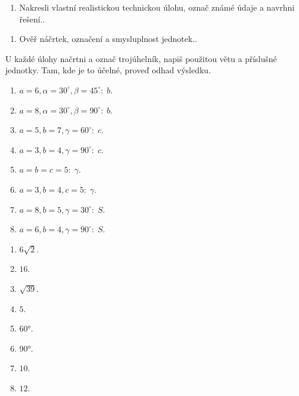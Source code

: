 \documentclass[11pt,a4paper]{article}
\begin{document}
\begin{zadaniReseniBox}[title={Rozšíření 1}]
\begin{enumerate}[label=\alph*)]
\item Nakresli vlastní realistickou technickou úlohu, označ známé údaje a navrhni řešení..
\end{enumerate}
\tcblower
\begin{enumerate}[label=\alph*)]
\item Ověř náčrtek, označení a smysluplnost jednotek..
\end{enumerate}
\end{zadaniReseniBox}
U každé úlohy načrtni a označ trojúhelník, napiš použitou větu a příslušné jednotky. Tam, kde je to účelné, proveď odhad výsledku.
\begin{zadaniReseniBox}[title={Domácí úkol}]
\begin{enumerate}[label=\alph*)]
\item $a=6,\alpha=30^\circ,\beta=45^\circ:\;b$.
\item $a=8,\alpha=30^\circ,\beta=90^\circ:\;b$.
\item $a=5,b=7,\gamma=60^\circ:\;c$.
\item $a=3,b=4,\gamma=90^\circ:\;c$.
\item $a=b=c=5:\;\gamma$.
\item $a=3,b=4,c=5:\;\gamma$.
\item $a=8,b=5,\gamma=30^\circ:\;S$.
\item $a=6,b=4,\gamma=90^\circ:\;S$.
\end{enumerate}
\tcblower
\begin{enumerate}[label=\alph*)]
\item $6\sqrt2$.
\item $16$.
\item $\sqrt{39}$.
\item $5$.
\item $60°$.
\item $90°$.
\item $10$.
\item $12$.
\end{enumerate}
\end{zadaniReseniBox}
\end{document}
